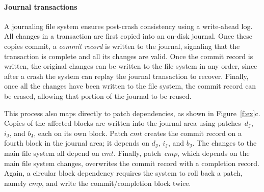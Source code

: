 \documentclass[9pt,twocolumn,letterpaper]{article}
\newcommand{\patch}{patch}
\newcommand{\patches}{patches}
\begin{document}
\paragraph{Journal transactions}
%
A journaling file system ensures post-crash consistency using
 a write-ahead log.
%
%
All changes in a transaction are first copied into an on-disk journal.
%
Once these copies commit, a \emph{commit record} is written
 to the journal, signaling that the transaction is complete and all
 its changes are valid.
%
Once the commit record is written, the original changes can be written to the
file system in any order, since after a crash the system can replay the
 journal transaction to recover.
%
Finally, once all the changes have been written to the file system, the commit
record can be erased, allowing that portion of the journal to be reused.

\begin{comment}
\begin{figure}[htb]
  \centering
  \texttt{[image: fig/examplesb\_2]}
  \caption{\label{fig:journal} An example journal transaction using \patches.}
\end{figure}
\end{comment}

\def\PXcmt{\textit{cmt}}
\def\PXcmp{\textit{cmp}}

This process also maps directly to patch dependencies, as shown in
 Figure~\ref{f:ex}c.
%
Copies of the affected blocks are written into the journal area using
 \patches\ $d_\textrm{J}$, $i_\textrm{J}$, and $b_\textrm{J}$, each on its
 own block.
%
Patch $\PXcmt$ creates the commit record on a fourth block in the journal
 area; it depends on $d_\textrm{J}$,
$i_\textrm{J}$, and $b_\textrm{J}$.
%
The changes to the main file system all depend on $\PXcmt$.
%
Finally, \patch\ $\PXcmp$, which depends on the main file system changes,
 overwrites the commit record with a completion record.
%
Again, a circular block dependency requires the system to roll back a
 patch, namely $\PXcmp$, and write the commit/completion block twice.

\begin{comment}
This arrangement of dependencies ensures that the commit record is not written
to disk until all the journal data is present there, that the updates to the
file system itself are not written until the commit record is present on disk,
and that the completion record is not written until the entire transaction is
complete.

This example also contains an instance of a \patch\ which will need to be
reverted: $cmp$, which overwrites the commit record written by $cmt$ (and
thus $\PBlock{cmp} = \PBlock{cmt}$), cannot be written with $cmt$ since
$cmp \PDDepend \{b$, $i$, $i'$, $d\} \PDDepend cmt$.
%
So, we must revert $cmp$ and write $\PBlock{cmp}$ with only $cmt$ applied,
then write $b$, $i$, $i'$, and $d$, and finally write $\PBlock{cmp}$
again in order to write $cmp$.
\end{comment}
\end{document}
